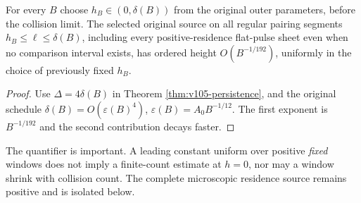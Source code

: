 \begin{corollary}
\label{cor:v105-flat}
For every $B$ choose $h_B\in(0,\delta(B))$ from the original
outer parameters, before the collision limit. The selected
original source on all regular pairing segments
$h_B\le\ell\le\delta(B)$, including every positive-residence
flat-pulse sheet even when no comparison interval exists, has
ordered height $O(B^{-1/192})$, uniformly in the choice of
previously fixed $h_B$.
\end{corollary}
\begin{proof}
Use $\Delta=4\delta(B)$ in Theorem
\ref{thm:v105-persistence}, and the original schedule
$\delta(B)=O(\varepsilon(B)^4)$,
$\varepsilon(B)=A_0B^{-1/12}$. The first exponent is
$B^{-1/192}$ and the second contribution decays faster.
\end{proof}
The quantifier is important. A leading constant uniform over
positive \emph{fixed} windows does not imply a finite-count
estimate at $h=0$, nor may a window shrink with collision count.
The complete microscopic residence source remains positive
and is isolated below.
